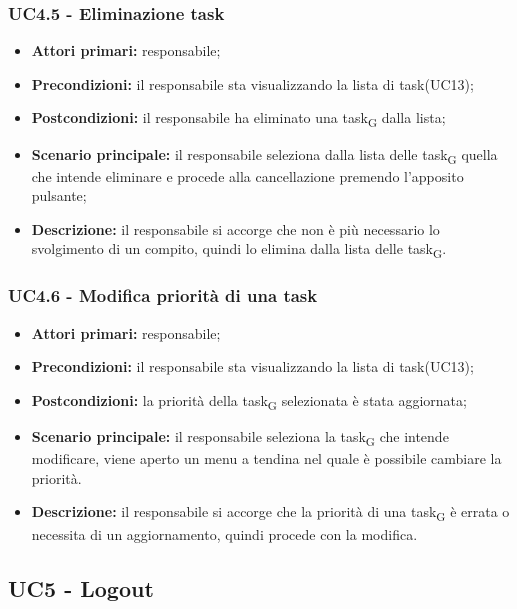 \subsubsection{UC4.5 - Eliminazione task}

\begin{itemize}
	\item 	\textbf{Attori primari:} responsabile;
	\item 	\textbf{Precondizioni:} il responsabile sta visualizzando la lista di task(UC13);
	\item 	\textbf{Postcondizioni:} il responsabile ha eliminato una \gls{task}\textsubscript{G} dalla lista;
	\item 	\textbf{Scenario principale:} il responsabile seleziona dalla lista delle \gls{task}\textsubscript{G} quella che intende eliminare e procede alla cancellazione premendo l’apposito pulsante;
	\item 	\textbf{Descrizione:} il responsabile si accorge che non è più necessario lo svolgimento di un compito, quindi lo elimina dalla lista delle \gls{task}\textsubscript{G}.

\end{itemize}

\subsubsection{UC4.6 - Modifica priorità di una task}
\begin{itemize}
	\item 	\textbf{Attori primari:} responsabile;
	\item 	\textbf{Precondizioni:} il responsabile sta visualizzando la lista di task(UC13);
	\item 	\textbf{Postcondizioni:} la priorità della \gls{task}\textsubscript{G} selezionata è stata aggiornata;
	\item 	\textbf{Scenario principale:} il responsabile seleziona la \gls{task}\textsubscript{G} che intende modificare, viene aperto un menu a tendina nel quale è possibile cambiare la priorità.
	\item 	\textbf{Descrizione:} il responsabile si accorge che la priorità di una \gls{task}\textsubscript{G} è errata o necessita di un aggiornamento, quindi procede con la modifica.
\end{itemize}

\subsection{UC5 - Logout}

